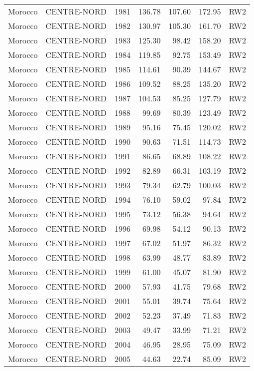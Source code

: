\begin{longtable}{lllrrrl}
  Morocco & CENTRE-NORD & 1981 & 136.78 & 107.60 & 172.95 & RW2 \\ 
  Morocco & CENTRE-NORD & 1982 & 130.97 & 105.30 & 161.70 & RW2 \\ 
  Morocco & CENTRE-NORD & 1983 & 125.30 & 98.42 & 158.20 & RW2 \\ 
  Morocco & CENTRE-NORD & 1984 & 119.85 & 92.75 & 153.49 & RW2 \\ 
  Morocco & CENTRE-NORD & 1985 & 114.61 & 90.39 & 144.67 & RW2 \\ 
  Morocco & CENTRE-NORD & 1986 & 109.52 & 88.25 & 135.20 & RW2 \\ 
  Morocco & CENTRE-NORD & 1987 & 104.53 & 85.25 & 127.79 & RW2 \\ 
  Morocco & CENTRE-NORD & 1988 & 99.69 & 80.39 & 123.49 & RW2 \\ 
  Morocco & CENTRE-NORD & 1989 & 95.16 & 75.45 & 120.02 & RW2 \\ 
  Morocco & CENTRE-NORD & 1990 & 90.63 & 71.51 & 114.73 & RW2 \\ 
  Morocco & CENTRE-NORD & 1991 & 86.65 & 68.89 & 108.22 & RW2 \\ 
  Morocco & CENTRE-NORD & 1992 & 82.89 & 66.31 & 103.19 & RW2 \\ 
  Morocco & CENTRE-NORD & 1993 & 79.34 & 62.79 & 100.03 & RW2 \\ 
  Morocco & CENTRE-NORD & 1994 & 76.10 & 59.02 & 97.84 & RW2 \\ 
  Morocco & CENTRE-NORD & 1995 & 73.12 & 56.38 & 94.64 & RW2 \\ 
  Morocco & CENTRE-NORD & 1996 & 69.98 & 54.12 & 90.13 & RW2 \\ 
  Morocco & CENTRE-NORD & 1997 & 67.02 & 51.97 & 86.32 & RW2 \\ 
  Morocco & CENTRE-NORD & 1998 & 63.99 & 48.77 & 83.89 & RW2 \\ 
  Morocco & CENTRE-NORD & 1999 & 61.00 & 45.07 & 81.90 & RW2 \\ 
  Morocco & CENTRE-NORD & 2000 & 57.93 & 41.75 & 79.68 & RW2 \\ 
  Morocco & CENTRE-NORD & 2001 & 55.01 & 39.74 & 75.64 & RW2 \\ 
  Morocco & CENTRE-NORD & 2002 & 52.23 & 37.49 & 71.83 & RW2 \\ 
  Morocco & CENTRE-NORD & 2003 & 49.47 & 33.99 & 71.21 & RW2 \\ 
  Morocco & CENTRE-NORD & 2004 & 46.95 & 28.95 & 75.09 & RW2 \\ 
  Morocco & CENTRE-NORD & 2005 & 44.63 & 22.74 & 85.09 & RW2 \\ 

\end{longtable}
